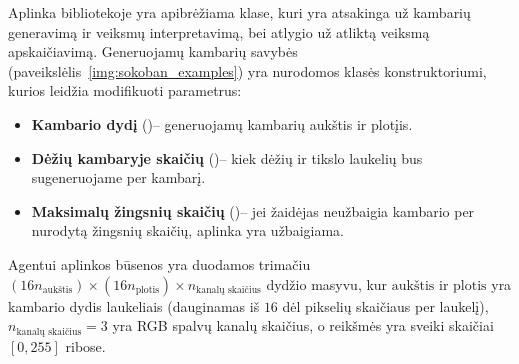\documentclass{VUMIFPSbakalaurinis}
\begin{document}
{	Aplinka bibliotekoje yra apibrėžiama  klase, kuri yra atsakinga už kambarių generavimą ir veiksmų interpretavimą, bei atlygio už atliktą veiksmą apskaičiavimą. Generuojamų kambarių savybės (paveikslėlis~\ref{img:sokoban_examples}) yra nurodomos klasės konstruktoriumi, kurios leidžia modifikuoti parametrus:
	\begin{itemize}
		\item \textbf{Kambario dydį} ()-- generuojamų kambarių aukštis ir plotįis.
		\item \textbf{Dėžių kambaryje skaičių} ()-- kiek dėžių ir tikslo laukelių bus sugeneruojame per kambarį.
		\item \textbf{Maksimalų žingsnių skaičių} ()-- jei žaidėjas neužbaigia kambario per nurodytą žingsnių skaičių, aplinka yra užbaigiama.
	\end{itemize}

	Agentui aplinkos būsenos yra duodamos trimačiu \((16 n_{\textrm{aukštis}}) \times (16 n_{\textrm{plotis}}) \times n_{\textrm{kanalų skaičius}} \) dydžio masyvu, kur \(\textrm{aukštis}\) ir \(\textrm{plotis}\) yra kambario dydis laukeliais (dauginamas iš \(16\) dėl pikselių skaičiaus per laukelį), \(n_{\textrm{kanalų skaičius}} = 3\) yra RGB spalvų kanalų skaičius, o reikšmės yra sveiki skaičiai \([0, 255]\) ribose.
	
}
\end{document}
